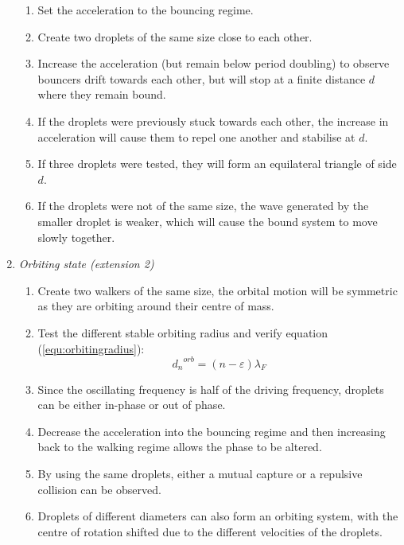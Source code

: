 \begin{enumerate}
\begin{enumerate}

\item  Set the acceleration to the bouncing regime.
\item  Create two droplets of the same size close to each other.
\item  Increase the acceleration (but remain below period doubling) to observe bouncers drift towards each other, but will stop at a finite distance $d$ where they remain bound.
\item  If the droplets were previously stuck towards each other, the increase in acceleration will cause them to repel one another and stabilise at $d$.
\item  If three droplets were tested, they will form an equilateral triangle of side $d$.
\item  If the droplets were not of the same size, the wave generated by the smaller droplet is weaker, which will cause the bound system to move slowly together.


\end{enumerate}

\item \textit{Orbiting state (extension 2)}



\begin{enumerate}
\item \textbf{ }Create two walkers of the same size, the orbital motion will be symmetric as they are orbiting around their centre of mass.

\item  Test the different stable orbiting radius and verify equation (\ref{equ:orbitingradius})\cite{protiere2006particle}:
\begin{equation}
    {d_n}^{orb}=\left(n-\varepsilon \right){\lambda }_F
    \label{equ:orbitingradius}
\end{equation}

\item  Since the oscillating frequency is half of the driving frequency, droplets can be either in-phase or out of phase.

\item  Decrease the acceleration into the bouncing regime and then increasing back to the walking regime allows the phase to be altered.

\item  By using the same droplets, either a mutual capture or a repulsive collision can be observed.

\item  Droplets of different diameters can also form an orbiting system, with the centre of rotation shifted due to the different velocities of the droplets.
\end{enumerate}

\end{enumerate}
